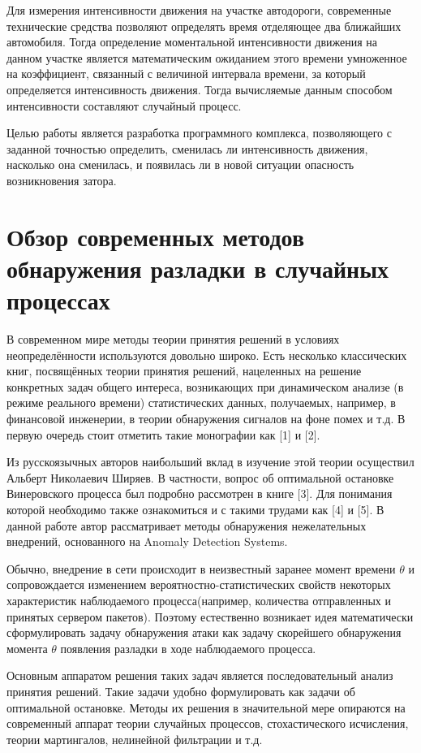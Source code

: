 \documentclass[a4paper,14pt]{article}
\begin{document}
Для измерения интенсивности движения на участке автодороги, современные технические средства позволяют определять время отделяющее два ближайших автомобиля. Тогда определение моментальной интенсивности движения на данном участке является математическим ожиданием этого времени умноженное на коэффициент, связанный с величиной интервала времени, за который определяется интенсивность движения. Тогда вычисляемые данным способом интенсивности составляют случайный процесс. 

Целью работы является разработка программного комплекса, позволяющего с заданной точностью определить, сменилась ли интенсивность движения, насколько она сменилась, и появилась ли в новой ситуации опасность возникновения затора. 

\section{Обзор современных методов обнаружения разладки в случайных процессах}

В современном мире методы теории принятия решений в условиях неопределённости используются довольно широко. Есть несколько классических книг, посвящённых теории принятия решений, нацеленных на решение конкретных задач общего интереса, возникающих при динамическом анализе (в режиме реального времени) статистических данных, получаемых, например, в финансовой инженерии, в теории обнаружения сигналов на фоне помех и т.д. В первую очередь стоит отметить такие монографии как [1] и [2]. 

Из русскоязычных авторов наибольший вклад в изучение этой теории осуществил Альберт Николаевич Ширяев. В частности, вопрос об оптимальной остановке Винеровского процесса был подробно рассмотрен в книге [3]. Для понимания которой необходимо также ознакомиться и с такими трудами как [4] и [5]. В данной работе автор рассматривает методы обнаружения нежелательных внедрений, основанного на Anomaly Detection Systems. 

Обычно, внедрение в сети происходит в неизвестный заранее момент времени $\theta$ и сопровождается изменением вероятностно-статистических свойств некоторых характеристик наблюдаемого процесса(например, количества отправленных и принятых сервером пакетов). Поэтому естественно возникает идея математически сформулировать задачу обнаружения атаки как задачу скорейшего обнаружения момента $\theta$ появления разладки в ходе наблюдаемого процесса. 

Основным аппаратом решения таких задач является последовательный анализ принятия решений. Такие задачи удобно формулировать как задачи об оптимальной остановке. Методы их решения в значительной мере опираются на современный аппарат теории случайных процессов, стохастического исчисления, теории мартингалов, нелинейной фильтрации и т.д.
\end{document}
